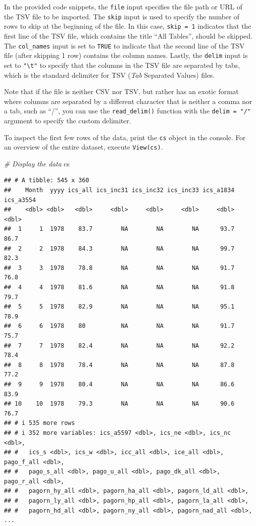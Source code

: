 \documentclass[
]{book}
\newenvironment{Shaded}{\begin{snugshade}}{\end{snugshade}}
\newcommand{\CommentTok}[1]{\textcolor[rgb]{0.56,0.35,0.01}{\textit{#1}}}
\newcommand{\NormalTok}[1]{#1}
\begin{document}
In the provided code snippets, the \texttt{file} input specifies the file path or URL of the TSV file to be imported. The \texttt{skip} input is used to specify the number of rows to skip at the beginning of the file. In this case, \texttt{skip\ =\ 1} indicates that the first line of the TSV file, which contains the title ``All Tables'', should be skipped. The \texttt{col\_names} input is set to \texttt{TRUE} to indicate that the second line of the TSV file (after skipping 1 row) contains the column names. Lastly, the \texttt{delim} input is set to \texttt{"\textbackslash{}t"} to specify that the columns in the TSV file are separated by tabs, which is the standard delimiter for TSV (\emph{Tab} Separated Values) files.

Note that if the file is neither CSV nor TSV, but rather has an exotic format where columns are separated by a different character that is neither a comma nor a tab, such as ``/'', you can use the \texttt{read\_delim()} function with the \texttt{delim\ =\ "/"} argument to specify the custom delimiter.

To inspect the first few rows of the data, print the \texttt{cs} object in the console. For an overview of the entire dataset, execute \texttt{View(cs)}.

\begin{Shaded}
\begin{Highlighting}[]
\CommentTok{\# Display the data}
\NormalTok{cs}
\end{Highlighting}
\end{Shaded}

\begin{verbatim}
## # A tibble: 545 x 360
##    Month  yyyy ics_all ics_inc31 ics_inc32 ics_inc33 ics_a1834 ics_a3554
##    <dbl> <dbl>   <dbl>     <dbl>     <dbl>     <dbl>     <dbl>     <dbl>
##  1     1  1978    83.7        NA        NA        NA      93.7      86.7
##  2     2  1978    84.3        NA        NA        NA      99.7      82.3
##  3     3  1978    78.8        NA        NA        NA      91.7      76.8
##  4     4  1978    81.6        NA        NA        NA      91.8      79.7
##  5     5  1978    82.9        NA        NA        NA      95.1      78.9
##  6     6  1978    80          NA        NA        NA      91.7      75.7
##  7     7  1978    82.4        NA        NA        NA      92.2      78.4
##  8     8  1978    78.4        NA        NA        NA      87.8      77.2
##  9     9  1978    80.4        NA        NA        NA      86.6      83.9
## 10    10  1978    79.3        NA        NA        NA      90.6      76.7
## # i 535 more rows
## # i 352 more variables: ics_a5597 <dbl>, ics_ne <dbl>, ics_nc <dbl>,
## #   ics_s <dbl>, ics_w <dbl>, icc_all <dbl>, ice_all <dbl>, pago_f_all <dbl>,
## #   pago_s_all <dbl>, pago_u_all <dbl>, pago_dk_all <dbl>, pago_r_all <dbl>,
## #   pagorn_hy_all <dbl>, pagorn_ha_all <dbl>, pagorn_ld_all <dbl>,
## #   pagorn_ly_all <dbl>, pagorn_hp_all <dbl>, pagorn_la_all <dbl>,
## #   pagorn_hd_all <dbl>, pagorn_ny_all <dbl>, pagorn_nad_all <dbl>, ...
\end{verbatim}
\end{document}
